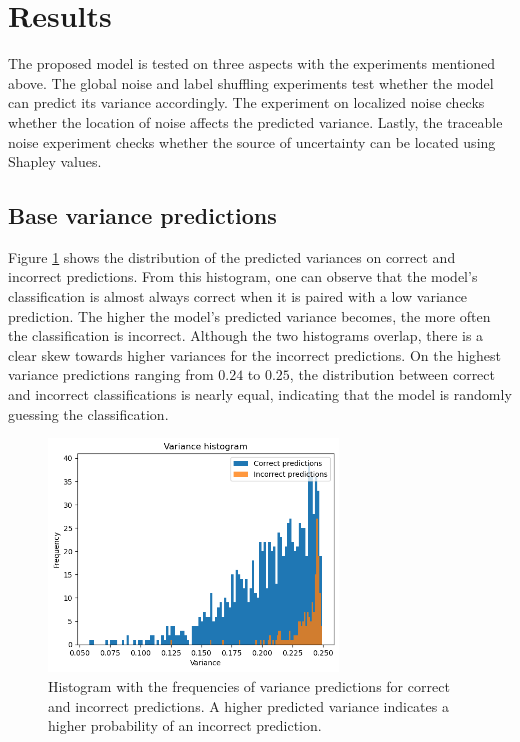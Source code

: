 \section{Results}\label{sec:results}

The proposed model is tested on three aspects with the experiments mentioned above. The global noise and label shuffling experiments test whether the model can predict its variance accordingly. The experiment on localized noise checks whether the location of noise affects the predicted variance. Lastly, the traceable noise experiment checks whether the source of uncertainty can be located using Shapley values.

\subsection{Base variance predictions}

Figure \ref{fig:histogram} shows the distribution of the predicted variances on correct and incorrect predictions. From this histogram, one can observe that the model's classification is almost always correct when it is paired with a low variance prediction. The higher the model's predicted variance becomes, the more often the classification is incorrect. Although the two histograms overlap, there is a clear skew towards higher variances for the incorrect predictions. On the highest variance predictions ranging from $0.24$ to $0.25$, the distribution between correct and incorrect classifications is nearly equal, indicating that the model is randomly guessing the classification.

\begin{figure}[!tbp]
    \centering
        \includegraphics[width=7.7cm]{img/histogram.png}
    \caption{Histogram with the frequencies of variance predictions for correct and incorrect predictions. A higher predicted variance indicates a higher probability of an incorrect prediction.}
    \label{fig:histogram}
\end{figure}


